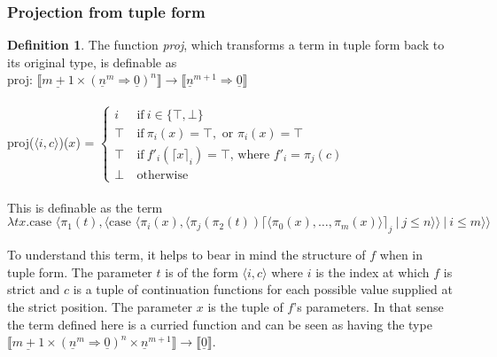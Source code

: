 \documentclass[12pt,a4paper]{report}
\theoremstyle{definition}
\newtheorem{definition}{Definition}[chapter]%
\theoremstyle{remark}
\begin{document}
\subsubsection{Projection from tuple form}
\begin{definition}
    The function \emph{proj}, which transforms a term in tuple form back to its original type, is definable as \\
    proj: $\llbracket \underline{m + 1} \times (\underline{n}^{m} \Rightarrow \underline{0})^n \rrbracket \rightarrow \llbracket \underline{n}^{m+1} \Rightarrow \underline{0} \rrbracket$\\\\
    proj($\langle i, c\rangle$)($x$) =
    $\begin{cases}
        i\ &\text{if}\ i \in \{\top, \bot\}\\
        \top\ &\text{if}\ \pi_i(x) = \top, \text{ or } \pi_i(x) = \top\\
        \top\ &\text{if}\ f'_i(\lceil x \rceil_i) = \top \text{, where } f'_i = \pi_j(c)\\
        \bot\ &\text{otherwise}
    \end{cases}$\\\\
    This is definable as the term
    \[
    \lambda tx. \text{case } \langle \pi_1(t), \langle \text{case } \langle \pi_i(x), \langle \pi_j(\pi_2(t)) \lceil \langle \pi_0(x), \dots, \pi_m(x)\rangle\rceil_j\ | \ j \le n \rangle \rangle\ |\ i \leq m \rangle \rangle
    \]
\end{definition}

To understand this term, it helps to bear in mind the structure of $f$ when in tuple form. The parameter $t$ is of the form $\langle i, c\rangle$ where $i$ is the index at which $f$ is strict and $c$ is a tuple of continuation functions for each possible value supplied at the strict position. The parameter $x$ is the tuple of $f$'s parameters. In that sense the term defined here is a curried function and can be seen as having the type $\llbracket \underline{m + 1} \times (\underline{n}^{m} \Rightarrow \underline{0})^n \times \underline{n}^{m+1} \rrbracket \rightarrow \llbracket \underline{0} \rrbracket$.
\end{document}
